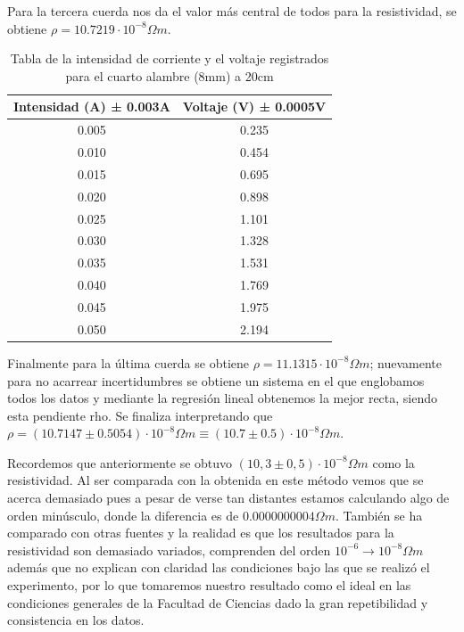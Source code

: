 \documentclass[article,12pt]{elsarticle}
\begin{document}
Para la tercera cuerda nos da el valor más central de todos para la resistividad, se obtiene $\rho = 10.7219 \cdot 10^{-8} \Omega m$.

    \begin{table}[H]
\begin{tabular}{|c|c|}
\hline
Intensidad (A) ± 0.003A & Voltaje (V) ± 0.0005V \\ \hline
0.005                   & 0.235                 \\ \hline
0.010                    & 0.454                 \\ \hline
0.015                   & 0.695                 \\ \hline
0.020                    & 0.898                 \\ \hline
0.025                   & 1.101                 \\ \hline
0.030                    & 1.328                 \\ \hline
0.035                   & 1.531                 \\ \hline
0.040                    & 1.769                 \\ \hline
0.045                   & 1.975                 \\ \hline
0.050                    & 2.194                 \\ \hline
\end{tabular}
\caption{Tabla de la intensidad de corriente y el voltaje registrados para el cuarto alambre (8mm) a 20cm}
\end{table}

Finalmente para la última cuerda se obtiene $\rho = 11.1315 \cdot 10^{-8} \Omega m$; nuevamente para no acarrear incertidumbres se obtiene un sistema en el que englobamos todos los datos y mediante la regresión lineal obtenemos la mejor recta, siendo esta pendiente rho. Se finaliza interpretando que $\rho = (10.7147 \pm 0.5054) \cdot 10^{-8} \Omega m \equiv (10.7 \pm 0.5) \cdot 10^{-8} \Omega m $.

Recordemos que anteriormente se obtuvo $(10,3 ± 0,5) \cdot 10^{-8} \Omega m $ como la resistividad. Al ser comparada con la obtenida en este método vemos que se acerca demasiado pues a pesar de verse tan distantes estamos calculando algo de orden minúsculo, donde la diferencia es de $0.0000000004 \Omega m$. También se ha comparado con otras fuentes y la realidad es que los resultados para la resistividad son demasiado variados, comprenden del orden $10^{-6} \rightarrow 10^{-8} \Omega m$ además que no explican con claridad las condiciones bajo las que se realizó el experimento, por lo que tomaremos nuestro resultado como el ideal en las condiciones generales de la Facultad de Ciencias dado la gran repetibilidad y consistencia en los datos.
\end{document}
